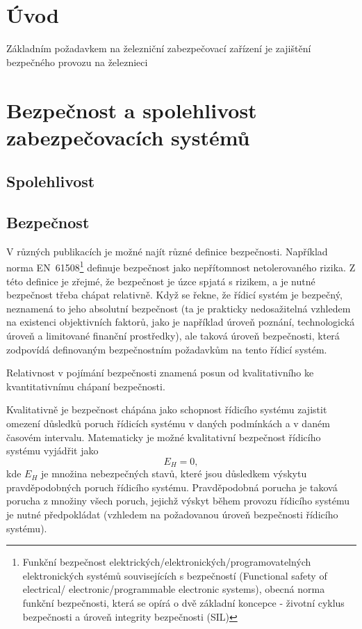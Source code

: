 \chapter{Úvod}
  Základním požadavkem na železniční zabezpečovací zařízení je zajištění bezpečného provozu na železnieci


\chapter{Bezpečnost a spolehlivost zabezpečovacích systémů}
 \section{Spolehlivost}
 \section{Bezpečnost}
    V různých publikacích je možné najít různé definice bezpečnosti. Například 
    norma EN~61508\footnote{Funkční bezpečnost elektrických/elektronických/programovatelných
    elektronických systémů souvisejících s bezpečností (Functional safety of electrical/
    electronic/programmable electronic systems), obecná norma funkční bezpečnosti, která
    se opírá o dvě základní koncepce - životní cyklus bezpečnosti a úroveň integrity
    bezpečnosti (SIL)} definuje bezpečnost jako nepřítomnost netolerovaného rizika.   
    Z této definice je zřejmé, že bezpečnost je úzce spjatá s rizikem, a je nutné bezpečnost
    třeba chápat relativně. Když se řekne, že řídicí systém je bezpečný, neznamená to jeho
    absolutní bezpečnost (ta je prakticky nedosažitelná vzhledem na existenci 
    objektivních faktorů, jako je například úroveň poznání, technologická úroveň a 
    limitované finanční prostředky), ale taková úroveň bezpečnosti, která zodpovídá 
    definovaným bezpečnostním požadavkům na tento řídicí systém. 

    Relativnost v pojímání bezpečnosti znamená posun od kvalitativního ke kvantitativnímu
    chápaní bezpečnosti.

    Kvalitativně je bezpečnost chápána jako schopnost řídicího systému zajistit omezení důsledků
    poruch řídicích systému v daných podmínkách a v daném časovém intervalu. Matematicky 
    je možné kvalitativní bezpečnost řídicího systému vyjádřit jako 
    \begin{equation}
      E_H = 0,
    \end{equation}
    kde \(E_H\) je množina nebezpečných stavů, které jsou důsledkem výskytu pravděpodobných 
    poruch řídicího systému. Pravděpodobná porucha je taková porucha z množiny všech poruch,
    jejichž výskyt během provozu řídicího systému je nutné předpokládat (vzhledem na požadovanou
    úroveň bezpečnosti řídicího systému).
	
